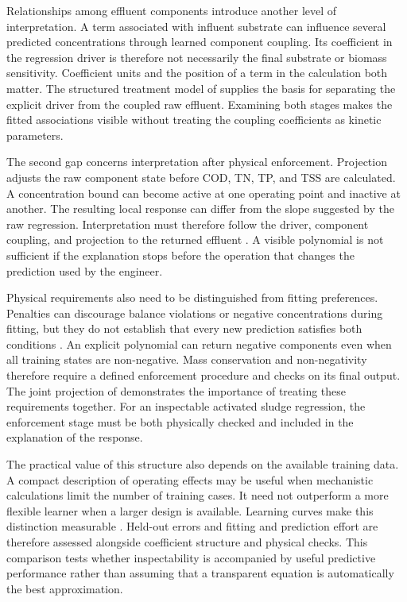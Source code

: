 Relationships among effluent components introduce another level of interpretation. A term associated with influent substrate can influence several predicted concentrations through learned component coupling. Its coefficient in the regression driver is therefore not necessarily the final substrate or biomass sensitivity. Coefficient units and the position of a term in the calculation both matter. The structured treatment model of \citet{Selerio2026} supplies the basis for separating the explicit driver from the coupled raw effluent. Examining both stages makes the fitted associations visible without treating the coupling coefficients as kinetic parameters.

The second gap concerns interpretation after physical enforcement. Projection adjusts the raw component state before COD, TN, TP, and TSS are calculated. A concentration bound can become active at one operating point and inactive at another. The resulting local response can differ from the slope suggested by the raw regression. Interpretation must therefore follow the driver, component coupling, and projection to the returned effluent \citep{Selerio2026}. A visible polynomial is not sufficient if the explanation stops before the operation that changes the prediction used by the engineer.

Physical requirements also need to be distinguished from fitting preferences. Penalties can discourage balance violations or negative concentrations during fitting, but they do not establish that every new prediction satisfies both conditions \citep{Hansen2024}. An explicit polynomial can return negative components even when all training states are non-negative. Mass conservation and non-negativity therefore require a defined enforcement procedure and checks on its final output. The joint projection of \citet{KircherVotsmeier2025} demonstrates the importance of treating these requirements together. For an inspectable activated sludge regression, the enforcement stage must be both physically checked and included in the explanation of the response.

The practical value of this structure also depends on the available training data. A compact description of operating effects may be useful when mechanistic calculations limit the number of training cases. It need not outperform a more flexible learner when a larger design is available. Learning curves make this distinction measurable \citep{VieringLoog2023}. Held-out errors and fitting and prediction effort are therefore assessed alongside coefficient structure and physical checks. This comparison tests whether inspectability is accompanied by useful predictive performance rather than assuming that a transparent equation is automatically the best approximation.

